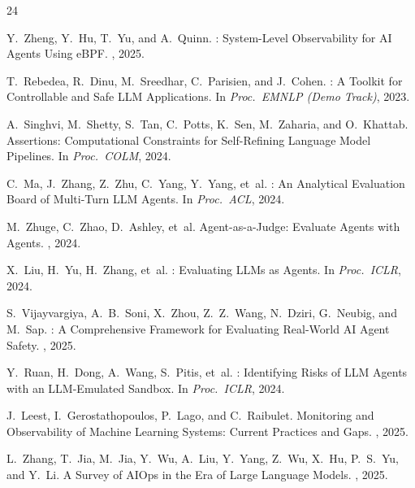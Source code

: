 \documentclass[sigconf,nonacm]{acmart}
\begin{document}

\begin{thebibliography}{24}

Y.~Zheng, Y.~Hu, T.~Yu, and A.~Quinn.
: System-Level Observability for {AI} Agents Using {eBPF}.
, 2025.

T.~Rebedea, R.~Dinu, M.~Sreedhar, C.~Parisien, and J.~Cohen.
: A Toolkit for Controllable and Safe {LLM}
  Applications.
\newblock In {\em Proc.\ EMNLP (Demo Track)}, 2023.

A.~Singhvi, M.~Shetty, S.~Tan, C.~Potts, K.~Sen, M.~Zaharia, and O.~Khattab.
 Assertions: Computational Constraints for Self-Refining
  Language Model Pipelines.
\newblock In {\em Proc.\ COLM}, 2024.

C.~Ma, J.~Zhang, Z.~Zhu, C.~Yang, Y.~Yang, et~al.
: An Analytical Evaluation Board of Multi-Turn {LLM}
  Agents.
\newblock In {\em Proc.\ ACL}, 2024.

M.~Zhuge, C.~Zhao, D.~Ashley, et~al.
\newblock Agent-as-a-Judge: Evaluate Agents with Agents.
, 2024.

X.~Liu, H.~Yu, H.~Zhang, et~al.
: Evaluating {LLMs} as Agents.
\newblock In {\em Proc.\ ICLR}, 2024.

S.~Vijayvargiya, A.~B.~Soni, X.~Zhou, Z.~Z.~Wang, N.~Dziri, G.~Neubig, and
  M.~Sap.
: A Comprehensive Framework for Evaluating
  Real-World {AI} Agent Safety.
, 2025.

Y.~Ruan, H.~Dong, A.~Wang, S.~Pitis, et~al.
: Identifying Risks of {LLM} Agents with an {LLM}-Emulated
  Sandbox.
\newblock In {\em Proc.\ ICLR}, 2024.

J.~Leest, I.~Gerostathopoulos, P.~Lago, and C.~Raibulet.
\newblock Monitoring and Observability of Machine Learning Systems: Current
  Practices and Gaps.
, 2025.

L.~Zhang, T.~Jia, M.~Jia, Y.~Wu, A.~Liu, Y.~Yang, Z.~Wu, X.~Hu, P.~S.~Yu,
  and Y.~Li.
\newblock A Survey of {AIOps} in the Era of Large Language Models.
, 2025.


\end{thebibliography}
\end{document}
